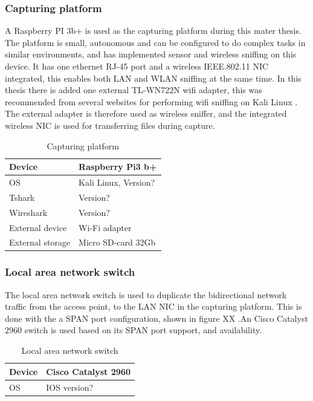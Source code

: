 \subsubsection{Capturing platform}
A Raspberry PI 3b+ is used as the capturing platform during this mater thesis. The platform is small, autonomous and can be configured to do complex tasks in similar environments, \cite{Raspberrypi3_as_a_platform} and \cite{Raspberrypi3_as_a_platform_1} has implemented sensor and wireless sniffing on this device. It has one ethernet RJ-45 port and a wireless IEEE.802.11 NIC integrated, this enables both LAN and WLAN sniffing at the same time. In this thesis there is added one external TL-WN722N wifi adapter, this was recommended from several websites for performing wifi sniffing on Kali Linux \cite{wifi_adapter_monitor_mode}. The external adapter is therefore used as wireless sniffer, and the integrated wireless NIC is used for transferring files during capture.

\begin{table}[!hbtp]
\centering
\caption{Capturing platform}
    \begin{tabular}{|l|l|}
    \hline
    Device           & Raspberry Pi3 b+     \\ \hline
    OS               & Kali Linux, Version? \\ \hline
    Tshark           & Version?             \\ \hline
    Wireshark        & Version?             \\ \hline
    External device  & Wi-Fi adapter        \\ \hline
    External storage & Micro SD-card 32Gb   \\ \hline
    \end{tabular}
\end{table}

\subsubsection{Local area network switch}
The local area network switch is used to duplicate the bidirectional network traffic from the access point, to the LAN NIC in the capturing platform.  This is done with the a SPAN port configuration, shown in figure XX \cite{Network_Span_port}.An Cisco Catalyst 2960 switch \cite{cisco_catalyst_8_port} is used based on its SPAN port support, and availability. 

\begin{table}[!hbtp]
\centering
\caption{Local area network switch}
    \begin{tabular}{|l|l|}
    \hline
        Device & Cisco Catalyst 2960 \\ \hline
        OS     & IOS version?        \\ \hline
    \end{tabular}
\end{table}


